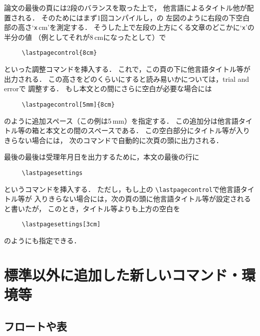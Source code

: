 \documentclass[onecolumn]{jsce}  %
\begin{document}
論文の最後の頁には2段のバランスを取った上で，
他言語によるタイトル他が配置される．
そのためにはまず1回コンパイルし，\figno{\ref{fig:layout}}の
左図のように右段の下空白部の高さ`{\tt x}\,cm'を測定する．
そうした上で左段の上方にくる文章のどこかに`{\tt x}'の半分の値
（例としてそれが8\,cmになったとして）で
\begin{verbatim}
     \lastpagecontrol{8cm}
\end{verbatim}
といった調整コマンドを挿入する．
これで，この頁の下に他言語タイトル等が出力される．
この高さをどのくらいにすると読み易いかについては，trial and errorで
調整する．
もし本文との間にさらに空白が必要な場合には
\begin{verbatim}
     \lastpagecontrol[5mm]{8cm}
\end{verbatim}
のように追加スペース（この例は5\,mm）を指定する．
この追加分は他言語タイトル等の箱と本文との間のスペースである．
この空白部分にタイトル等が入りきらない場合には，
次のコマンドで自動的に次頁の頭に出力される．

最後の最後は受理年月日を出力するために，本文の最後の行に
\begin{verbatim}
     \lastpagesettings
\end{verbatim}
というコマンドを挿入する．
ただし，もし上の \verb+\lastpagecontrol+で他言語タイトル等が
入りきらない場合には，次の頁の頭に他言語タイトル等が設定されると書いたが，
このとき，タイトル等よりも上方の空白を
\begin{verbatim}
     \lastpagesettings[3cm]
\end{verbatim}
のようにも指定できる．




\section{標準以外に追加した新しいコマンド・環境等}

\subsection{フロートや表}
\end{document}
